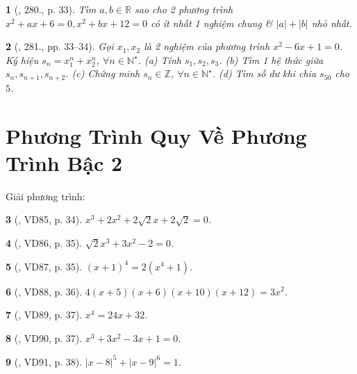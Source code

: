 \documentclass{article}
\newtheorem{baitoan}{}
\begin{document}
\begin{baitoan}[\cite{Binh_Toan_9_tap_2}, 280., p. 33]
	Tìm $a,b\in\mathbb{R}$ sao cho 2 phương trình $x^2 + ax + 6 = 0,x^2 + bx + 12 = 0$ có ít nhất 1 nghiệm chung \& $|a| + |b|$ nhỏ nhất.
\end{baitoan}

\begin{baitoan}[\cite{Binh_Toan_9_tap_2}, 281., pp. 33--34]
	Gọi $x_1,x_2$ là 2 nghiệm của phương trình $x^2 - 6x + 1 = 0$. Ký hiệu $s_n = x_1^n + x_2^n$, $\forall n\in\mathbb{N}^\star$. (a) Tính $s_1,s_2,s_3$. (b) Tìm 1 hệ thức giữa $s_n,s_{n+1},s_{n+2}$. (c) Chứng minh $s_n\in\mathbb{Z}$, $\forall n\in\mathbb{N}^\star$. (d) Tìm số dư khi chia $s_{50}$ cho $5$.
\end{baitoan}


\section{Phương Trình Quy Về Phương Trình Bậc 2}
Giải phương trình:

\begin{baitoan}[\cite{Binh_Toan_9_tap_2}, VD85, p. 34]
	$x^3 + 2x^2 + 2\sqrt{2}x + 2\sqrt{2} = 0$.
\end{baitoan}

\begin{baitoan}[\cite{Binh_Toan_9_tap_2}, VD86, p. 35]
	$\sqrt{2}x^3 + 3x^2 - 2 = 0$.
\end{baitoan}

\begin{baitoan}[\cite{Binh_Toan_9_tap_2}, VD87, p. 35]
	$(x + 1)^4 = 2(x^4 + 1)$.
\end{baitoan}

\begin{baitoan}[\cite{Binh_Toan_9_tap_2}, VD88, p. 36]
	$4(x + 5)(x + 6)(x + 10)(x + 12) = 3x^2$.
\end{baitoan}

\begin{baitoan}[\cite{Binh_Toan_9_tap_2}, VD89, p. 37]
	$x^4 = 24x + 32$.
\end{baitoan}

\begin{baitoan}[\cite{Binh_Toan_9_tap_2}, VD90, p. 37]
	$x^3 + 3x^2 - 3x + 1 = 0$.
\end{baitoan}

\begin{baitoan}[\cite{Binh_Toan_9_tap_2}, VD91, p. 38]
	$|x - 8|^5 + |x - 9|^6 = 1$.
\end{baitoan}
\end{document}
